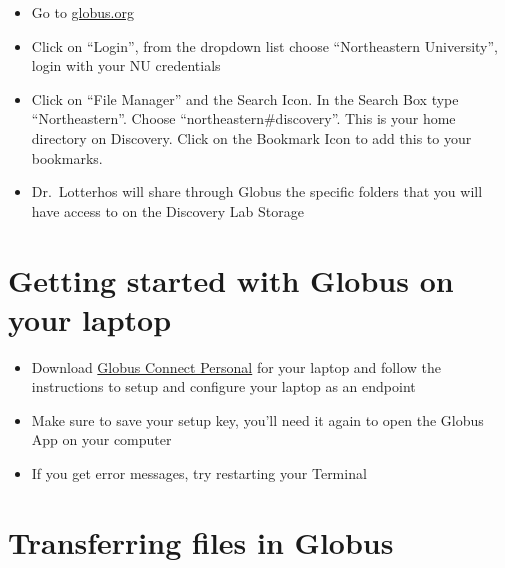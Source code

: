 \documentclass[
  letterpaper,
  DIV=11,
  numbers=noendperiod]{scrreprt}
\begin{document}

\begin{itemize}
\item
  Go to
  \href{https://drk-lo.github.io/lotterhoslabprotocols/discovery_2-globus/globus.org}{globus.org}
\item
  Click on ``Login'', from the dropdown list choose ``Northeastern
  University'', login with your NU credentials
\item
  Click on ``File Manager'' and the Search Icon. In the Search Box type
  ``Northeastern''. Choose ``northeastern\#discovery''. This is your
  home directory on Discovery. Click on the Bookmark Icon to add this to
  your bookmarks.
\item
  Dr.~Lotterhos will share through Globus the specific folders that you
  will have access to on the Discovery Lab Storage
\end{itemize}

\hypertarget{getting-started-with-globus-on-your-laptop}{%
\section*{\texorpdfstring{\textbf{Getting started with Globus on your
laptop}}{Getting started with Globus on your laptop}}\label{getting-started-with-globus-on-your-laptop}}


\begin{itemize}
\item
  Download \href{https://www.globus.org/globus-connect-personal}{Globus
  Connect Personal} for your laptop and follow the instructions to setup
  and configure your laptop as an endpoint
\item
  Make sure to save your setup key, you'll need it again to open the
  Globus App on your computer
\item
  If you get error messages, try restarting your Terminal
\end{itemize}

\hypertarget{transferring-files-in-globus}{%
\section*{\texorpdfstring{\textbf{Transferring files in
Globus}}{Transferring files in Globus}}\label{transferring-files-in-globus}}
\end{document}
